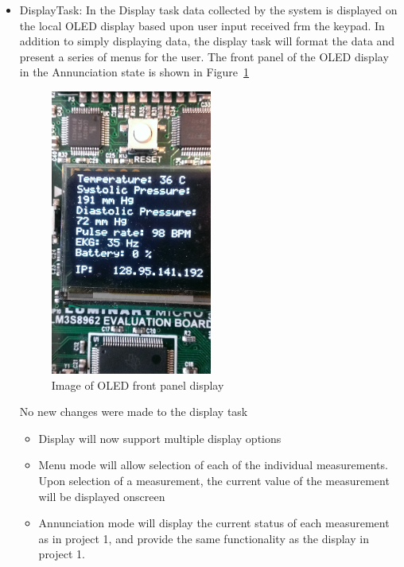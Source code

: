 \documentclass[12pt]{article} %
\begin{document}
\begin{itemize}
  \item DisplayTask: 
      In the Display task data collected by the system is
      displayed on the local OLED display based upon user input received frm
      the keypad. In addition to simply displaying data, the display task will
      format the data and present a series of menus for the user. The front
      panel of the OLED display in the Annunciation state is shown in
      Figure~\ref{fig:annun}

		\begin{figure}[h]
			\centering
			\includegraphics[width=0.5\textwidth]{../design/oled_annunciation1.jpg}
			\caption{Image of OLED front panel display}
			\label{fig:annun}
		\end{figure}

		No new changes were made to the display task
    \begin{itemize}
      \item Display will now support multiple display options
      \item Menu mode will allow selection of each of the individual
	measurements. Upon selection of a measurement, the current value of the
	measurement will be displayed onscreen
      \item Annunciation mode will display the current status of each
	measurement as in project 1, and provide the same functionality as the
	display in project 1.
    \end{itemize}


\end{itemize}
\end{document}

